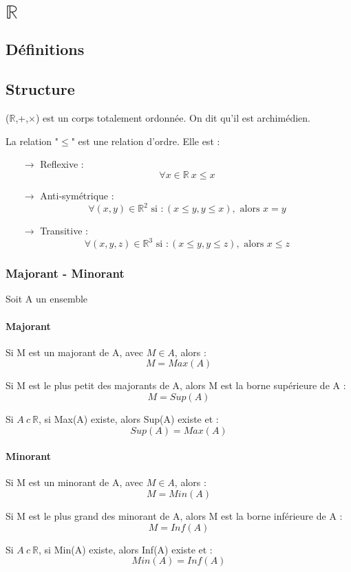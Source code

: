 \chapter{$\mathbb{R}$}
\section{D\'efinitions}
\section{Structure}
\begin{de}
($\mathbb{R}$,+,$\times$) est un corps totalement ordonnée. On dit qu'il est archimédien.\\
\end{de}
\begin{de}
La relation "$\leq$" est une relation d'ordre. Elle est :
\begin{itemize}
 \item[$\rightarrow$] Reflexive : $$\forall x \in \mathbb{R}~ x \leq x$$
 \item[$\rightarrow$] Anti-symétrique : $$\forall(x,y)\in \mathbb{R}^2 \mbox{ si } : (x \leq y,y\leq x),  \mbox{ alors } x=y$$
 \item[$\rightarrow$] Transitive : $$\forall(x,y,z)\in \mathbb{R}^3 \mbox{ si } : (x \leq y,y\leq z), \mbox{ alors } x\leq z$$
\end{itemize}
\end{de}
\subsection{Majorant - Minorant}
Soit A un ensemble
\subsubsection{Majorant}
\begin{de}
Si M est un majorant de A, avec $M \in A$, alors :
$$M = Max(A)$$
\end{de}
\begin{de}
Si M est le plus petit des majorants de A, alors M est la borne supérieure de A : 
$$M = Sup(A)$$
\end{de}
\begin{prop}
Si $A~ c~ \mathbb{R}$, si Max(A) existe, alors Sup(A) existe et :
$$Sup(A) = Max(A)$$
\end{prop}
\subsubsection{Minorant}
\begin{de}
Si M est un minorant de A, avec $M \in A$, alors :
$$M = Min(A)$$
\end{de}
\begin{de}
Si M est le plus grand des minorant de A, alors M est la borne inférieure de A : 
$$M = Inf(A)$$
\end{de}
\begin{prop}
Si $A~ c~ \mathbb{R}$, si Min(A) existe, alors Inf(A) existe et :
$$Min(A) = Inf(A)$$
\end{prop}
